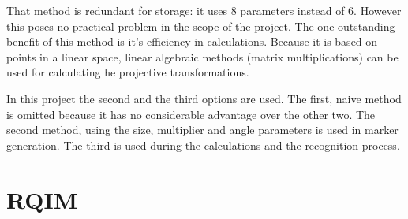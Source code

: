 That method is redundant for storage: it uses 8 parameters instead of 6.
However this poses no practical problem in the scope of the project.
The one outstanding benefit of this method is it's efficiency in calculations.
Because it is based on points in a linear space, linear algebraic methods (matrix multiplications) can be used for calculating he projective transformations.

In this project the second and the third options are used.
The first, naive method is omitted because it has no considerable advantage over the other two.
The second method, using the size, multiplier and angle parameters is used in marker generation.
The third is used during the calculations and the recognition process.

\section{RQIM}
